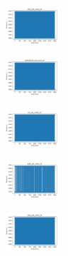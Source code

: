 \begin{figure}[H]
    \begin{subfigure}
        \centering
        \includegraphics[width=0.234\textwidth]{img/ageun/rand_set_const_10_277451237_time.png}
    \end{subfigure}
    \hfill
    \begin{subfigure}
        \centering
        \includegraphics[width=0.234\textwidth]{img/ageun/newthyroid_set_const_10_277451237_time.png}
    \end{subfigure}
    \hfill
    \begin{subfigure}
        \centering
        \includegraphics[width=0.234\textwidth]{img/ageun/iris_set_const_10_49258669_time.png}
    \end{subfigure}
    \hfill
    \begin{subfigure}
        \centering
        \includegraphics[width=0.234\textwidth]{img/ageun/ecoli_set_const_10_49258669_time.png}
    \end{subfigure}
    \hfill
    \begin{subfigure}
        \centering
        \includegraphics[width=0.234\textwidth]{img/ageun/rand_set_const_10_49258669_time.png}
    \end{subfigure}
    \hfill
    \begin{subfigure}
        \centering

\end{subfigure}
\end{figure}
